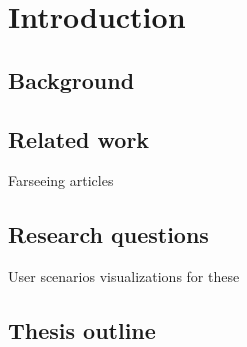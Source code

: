 \chapter{Introduction}

\section{Background}

\section{Related work}
Farseeing articles
\section{Research questions}
User scenarios visualizations for these
\section{Thesis outline}
